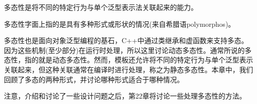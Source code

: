 多态性是将不同的特定行为与单个泛型表示法关联起来的能力。

\begin{tcolorbox}[colback=webgreen!5!white,colframe=webgreen!75!black]
\hspace*{0.75cm}多态性字面上指的是具有多种形式或形状的情况(来自希腊语polymorphos)。
\end{tcolorbox}

多态性也是面向对象泛型编程的基石，C++中通过类继承和虚函数来支持多态。因为这些机制(至少部分)在运行时处理，所以这里讨论动态多态性。通常所说的多态性，指的就是动态多态性。然而，模板还允许将不同的特定行为与单个泛型表示关联起来，但这种关联通常在编译时进行处理，称之为静态多态性。本章中，我们回顾了多态的两种形式，并讨论哪种形式适合于哪种情况。

注意，介绍和讨论了一些设计问题之后，第22章将讨论一些处理多态性的方法。